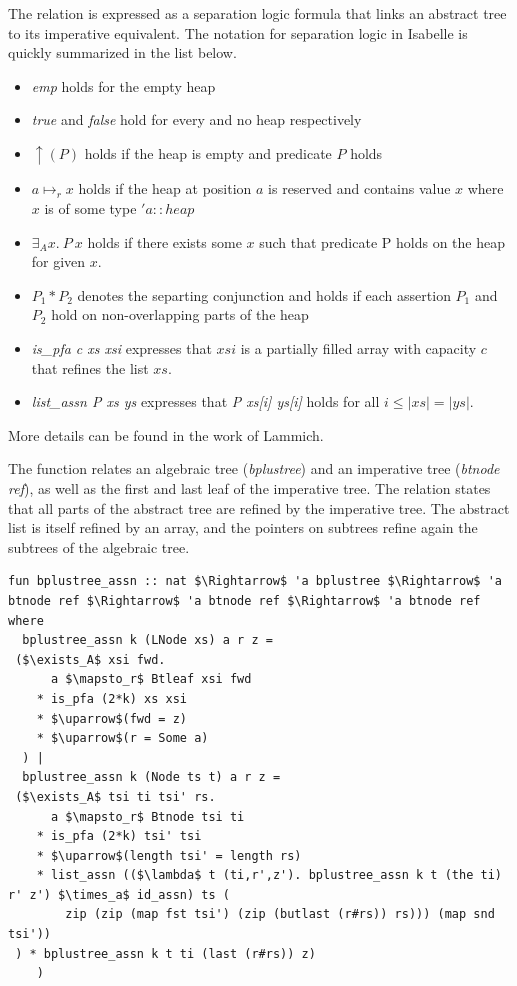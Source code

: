 \documentclass[a4paper,UKenglish,cleveref, autoref, thm-restate]{lipics-v2021}
\begin{document}
The relation is expressed as a separation logic formula that links an abstract tree to its
imperative equivalent.
The notation for separation logic in Isabelle is quickly summarized in the list below.
\begin{itemize}
    \item \textit{emp} holds for the empty heap
    \item \textit{true} and \textit{false} hold for every and no heap respectively
    \item $\uparrow(P)$ holds if the heap is empty and predicate $P$ holds
    \item $a \mapsto_r x$ holds if the heap at position $a$ is reserved and contains
    value $x$ where $x$ is of some type $'a::heap$
    \item $\exists_A x.\ P\ x$ holds if there exists some $x$ such that predicate P
    holds on the heap for given $x$.
    \item $P_1 * P_2$ denotes the separting conjunction and holds if each assertion $P_1$ and $P_2$ hold on non-overlapping parts
    of the heap
    \item \emph{is\_pfa c xs xsi} expresses that $xsi$ is a partially filled array
    with capacity $c$ that refines the list $xs$.
    \item \emph{list\_assn P xs ys} expresses that \emph{P xs[i] ys[i]} holds for all $i \leq |xs| = |ys|$.
\end{itemize}
More details can be found in the work of Lammich. \cite{DBLP:journals/afp/LammichM12}

The function relates an algebraic tree (\emph{bplustree})
and an imperative tree (\emph{btnode ref}), as well as the first and last leaf of the imperative tree.
The relation states that all parts of the abstract tree
are refined by the imperative tree.
The abstract list is itself refined by an array,
and the pointers on subtrees refine again the subtrees of the algebraic tree.

\begin{lstlisting}[mathescape=true, language=Isabelle,label=lst:btree-relation]
fun bplustree_assn :: nat $\Rightarrow$ 'a bplustree $\Rightarrow$ 'a btnode ref $\Rightarrow$ 'a btnode ref $\Rightarrow$ 'a btnode ref where
  bplustree_assn k (LNode xs) a r z =
 ($\exists_A$ xsi fwd.
      a $\mapsto_r$ Btleaf xsi fwd
    * is_pfa (2*k) xs xsi
    * $\uparrow$(fwd = z)
    * $\uparrow$(r = Some a)
  ) |
  bplustree_assn k (Node ts t) a r z =
 ($\exists_A$ tsi ti tsi' rs.
      a $\mapsto_r$ Btnode tsi ti
    * is_pfa (2*k) tsi' tsi
    * $\uparrow$(length tsi' = length rs)
    * list_assn (($\lambda$ t (ti,r',z'). bplustree_assn k t (the ti) r' z') $\times_a$ id_assn) ts (
        zip (zip (map fst tsi') (zip (butlast (r#rs)) rs))) (map snd tsi'))
 ) * bplustree_assn k t ti (last (r#rs)) z)
    )
\end{lstlisting}
\end{document}
